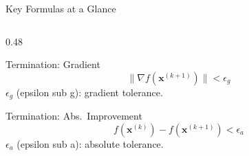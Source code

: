 \documentclass[aspectratio=169,10pt]{beamer}
\newcommand{\bx}{\mathbf{x}}
\newcommand{\grad}{\nabla}
\begin{document}
\begin{frame}[allowframebreaks]{Key Formulas at a Glance}
\begin{columns}[T]
\begin{column}{0.48\textwidth}
      \begin{block}{Termination: Gradient}
        \[
          \|\grad f(\bx^{(k+1)})\|<\epsilon_g
        \]
        $\epsilon_g$ (epsilon sub g): gradient tolerance.
      \end{block}

      \begin{block}{Termination: Abs.\ Improvement}
        \[
          f(\bx^{(k)})-f(\bx^{(k+1)})<\epsilon_a
        \]
        $\epsilon_a$ (epsilon sub a): absolute tolerance.
      \end{block}
    \end{column}
  \end{columns}

\end{frame}

\end{document}
